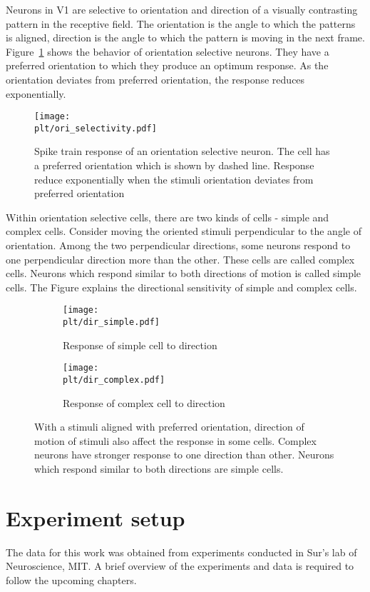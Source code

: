 \documentclass[MTech]{iitmdiss}
\newcommand{\plt}{thesis_plots}
\begin{document}
Neurons in V1 are selective to orientation and direction of a visually contrasting pattern in the receptive field. The orientation is the angle to which the patterns is aligned, direction is the angle to which the pattern is moving in the next frame. Figure~\ref{fig:ori_resp} shows the behavior of orientation selective neurons. They have a preferred orientation to which they produce an optimum response. As the orientation deviates from preferred orientation, the response reduces exponentially. 
\begin{figure}[h]
\centering
  \texttt{[image: \\plt/ori\_selectivity.pdf]}
  \caption{Spike train response of an orientation selective neuron. The cell has a preferred orientation which is shown by dashed line. Response reduce exponentially when the stimuli orientation deviates from preferred orientation}
  \label{fig:ori_resp}
\end{figure}
Within orientation selective cells, there are two kinds of cells - simple and complex cells. Consider moving the oriented stimuli perpendicular to the angle of orientation. Among the two perpendicular directions, some neurons respond to one perpendicular direction more than the other. These cells are called complex cells. Neurons which respond similar to both directions of motion is called simple cells. The Figure explains the directional sensitivity of simple and complex cells.
\begin{figure}[h]
  \begin{subfigure}[b]{0.5\textwidth}
    \texttt{[image: \\plt/dir\_simple.pdf]}
    \caption{Response of simple cell to direction}
    \label{fig:ori_simple}
  \end{subfigure}%
  \begin{subfigure}[b]{0.5\textwidth}
    \texttt{[image: \\plt/dir\_complex.pdf]}
    \caption{Response of complex cell to direction}
    \label{fig:dir_simple}
  \end{subfigure}%
  \caption{With a stimuli aligned with preferred orientation, direction of motion of stimuli also affect the response in some cells. Complex neurons have stronger response to one direction than other. Neurons which respond similar to both directions are simple cells.}
  \label{fig:oridir_simple}
\end{figure}
\section{Experiment setup} %
\label{sec:experiment_setup}
The data for this work was obtained from experiments conducted in Sur's lab of Neuroscience, MIT. A brief overview of the experiments and data is required to follow the upcoming chapters.
\end{document}
